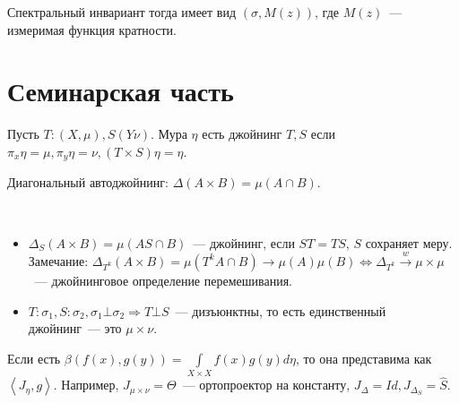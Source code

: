 \documentclass{article}
\begin{document}
Спектральный инвариант тогда имеет вид $(\sigma, M(z))$, где $M(z)$~---
измеримая функция кратности.

\section{Семинарская часть}

\begin{definition}
	Пусть $T: (X, \mu), S(Y \nu)$. Мура $\eta$ есть джойнинг $T, S$ если $\pi_x
	\eta = \mu, \pi_y \eta = \nu, (T \times S) \eta = \eta$.
\end{definition}

Диагональный автоджойнинг: $\Delta(A \times B) = \mu(A \cap B)$.

\begin{exercise}~
	\begin{itemize}
		\item $\Delta_S (A \times B) = \mu(AS \cap B)$~--- джойнинг, если $ST = TS$,
			$S$ сохраняет меру. Замечание: $\Delta_{T^k}(A \times B) = \mu(T^k A \cap
			B) \rightarrow \mu(A) \mu(B) \Leftrightarrow \Delta_{T^k}
			\overset{w}\rightarrow \mu \times \mu$~--- джойнинговое определение
			перемешивания.
		\item $T: \sigma_1, S: \sigma_2, \sigma_1 \bot \sigma_2 \Rightarrow T \bot
			S$~--- дизъюнктны, то есть единственный джойнинг~--- это $\mu \times \nu$.
	\end{itemize}
\end{exercise}

Если есть $\beta(f(x), g(y)) = \int\limits_{X \times X} f(x)g(y) d\eta$, то она
представима как $\left< J_\eta, g \right>$. Например, $J_{\mu \times \nu} =
\Theta$~--- ортопроектор на константу, $J_\Delta = Id, J_{\Delta_S} = \hat S$.
\end{document}
